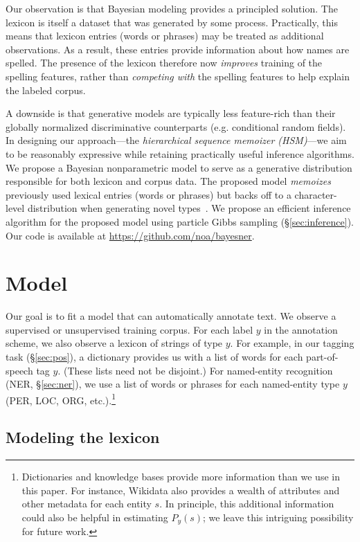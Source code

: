\documentclass[11pt]{article}
\begin{document}
Our observation is that Bayesian modeling provides a principled solution.
The lexicon is itself a dataset that was generated by some process.
Practically, this means that lexicon entries (words or phrases) may be
treated as additional observations.  As a result, these entries
provide information about how names are spelled.  The presence of the
lexicon therefore now {\em improves} training of the spelling features,
rather than {\em competing with} the spelling features to help explain
the labeled corpus.

A downside is that generative models are typically less
feature-rich than their globally normalized discriminative
counterparts (e.g. conditional random fields). In designing our
approach---the {\em hierarchical sequence memoizer (HSM)}---we aim to be reasonably expressive while retaining
practically useful inference algorithms. We propose a Bayesian nonparametric model to
serve as a generative distribution responsible for both lexicon and corpus data. The proposed model \emph{memoizes} previously used lexical entries
(words or phrases) but backs off to a character-level distribution when
generating novel types~\cite{teh2006pylm,mochihashi2009}. We
propose an efficient inference algorithm for the proposed model
using particle Gibbs sampling (\S\ref{sec:inference}).  Our
code is available at \url{https://github.com/noa/bayesner}.

\section{Model}\label{sec:model}

Our goal is to fit a model that can automatically annotate text.  We observe a supervised or unsupervised training corpus.  For each label $y$ in the annotation scheme, we also observe a lexicon of strings of type $y$.
For example, in our tagging task (\S\ref{sec:pos}), a dictionary provides us with a list of words
for each part-of-speech tag $y$.  (These lists need not be disjoint.)
For named-entity recognition (NER, \S\ref{sec:ner}), we use a list of words or phrases for each named-entity type $y$ (PER, LOC, ORG, etc.).\footnote{Dictionaries and knowledge bases provide more information than we use in this paper. For instance, Wikidata also provides
   a wealth of attributes and other metadata for each entity $s$. In principle,
   this additional information could also be helpful in estimating $P_y(s)$; we leave this intriguing possibility for future work.}

\subsection{Modeling the lexicon}\label{sec:lexicon}
\end{document}
